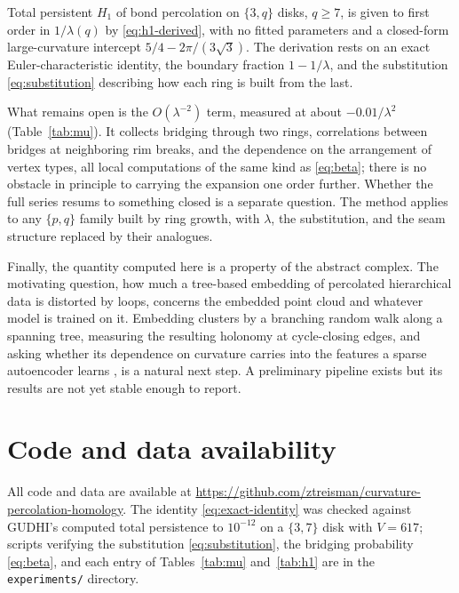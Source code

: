 \documentclass[11pt]{article}
\begin{document}
Total persistent $H_1$ of bond percolation on $\{3,q\}$ disks, $q\ge7$, is given to first order in $1/\lambda(q)$ by \eqref{eq:h1-derived}, with no fitted parameters and a closed-form large-curvature intercept $5/4-2\pi/(3\sqrt3)$. The derivation rests on an exact Euler-characteristic identity, the boundary fraction $1-1/\lambda$, and the substitution \eqref{eq:substitution} describing how each ring is built from the last.

What remains open is the $O(\lambda^{-2})$ term, measured at about $-0.01/\lambda^2$ (Table~\ref{tab:mu}). It collects bridging through two rings, correlations between bridges at neighboring rim breaks, and the dependence on the arrangement of vertex types, all local computations of the same kind as \eqref{eq:beta}; there is no obstacle in principle to carrying the expansion one order further. Whether the full series resums to something closed is a separate question. The method applies to any $\{p,q\}$ family built by ring growth, with $\lambda$, the substitution, and the seam structure replaced by their analogues.

Finally, the quantity computed here is a property of the abstract complex. The motivating question, how much a tree-based embedding of percolated hierarchical data is distorted by loops, concerns the embedded point cloud and whatever model is trained on it. Embedding clusters by a branching random walk along a spanning tree, measuring the resulting holonomy at cycle-closing edges, and asking whether its dependence on curvature carries into the features a sparse autoencoder learns \citep{bricken2023,cunningham2023}, is a natural next step. A preliminary pipeline exists but its results are not yet stable enough to report.

\section*{Code and data availability}

All code and data are available at \url{https://github.com/ztreisman/curvature-percolation-homology}. The identity \eqref{eq:exact-identity} was checked against GUDHI's computed total persistence to $10^{-12}$ on a $\{3,7\}$ disk with $V=617$; scripts verifying the substitution \eqref{eq:substitution}, the bridging probability \eqref{eq:beta}, and each entry of Tables~\ref{tab:mu} and~\ref{tab:h1} are in the \texttt{experiments/} directory.



\end{document}
